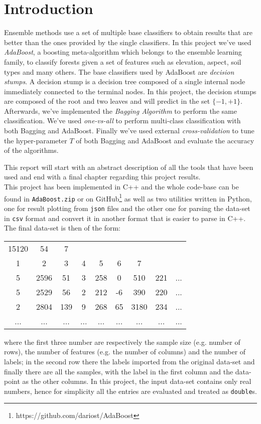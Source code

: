 \chapter{Introduction}
Ensemble methods use a set of multiple base classifiers to obtain results that are better than the ones provided by the single classifiers. In this project we've used \textit{AdaBoost}, a boosting meta-algorithm which belongs to the ensemble learning family, to classify forests given a set of features such as elevation, aspect, soil types and many others. The base classifiers used by AdaBoost are \textit{decision stumps}. A decision stump is a decision tree composed of a single internal node immediately connected to the terminal nodes. In this project, the decision stumps are composed of the root and two leaves and will predict in the set $\lbrace-1, +1\rbrace$. Afterwards, we've implemented the \textit{Bagging Algorithm} to perform the same classification. We've used \textit{one-vs-all} to perform multi-class classification with both Bagging and AdaBoost. Finally we've used external \textit{cross-validation} to tune the hyper-parameter $T$ of both Bagging and AdaBoost and evaluate the accuracy of the algorithms.

This report will start with an abstract description of all the tools that have been used and end with a final chapter regarding this project results.\\
This project has been implemented in C++ and the whole code-base can be found in \texttt{AdaBoost.zip} or on GitHub\footnote{https://github.com/dariost/AdaBoost} as well as two utilities written in Python, one for result plotting from \texttt{json} files and the other one for parsing the data-set in \texttt{csv} format and convert it in another format that is easier to parse in C++. The final data-set is then of the form:
\begin{center}
\begin{tabular}{ccccccccc}
	15120 & 54 & 7 &  &  &  &  &  &  \\ 
	1 & 2 & 3 & 4 & 5 & 6 & 7 &  &  \\ 
	5 & 2596 & 51 & 3 & 258 & 0 & 510 & 221 & ... \\
	5 & 2529 & 56 & 2 & 212 & -6 & 390 & 220 & ... \\
	2 & 2804 & 139 & 9 & 268 & 65 & 3180 & 234 & ... \\
	... & ... & ... & ... & ... & ... & ... & ... & ... \\
\end{tabular}
\end{center} 
where the first three number are respectively the sample size (e.g. number of rows), the number of features (e.g. the number of columns) and the number of labels; in the second row there the labels imported from the original data-set and finally there are all the samples, with the label in the first column and the data-point as the other columns. In this project, the input data-set contains only real numbers, hence for simplicity all the entries are evaluated and treated as \texttt{double}s.

